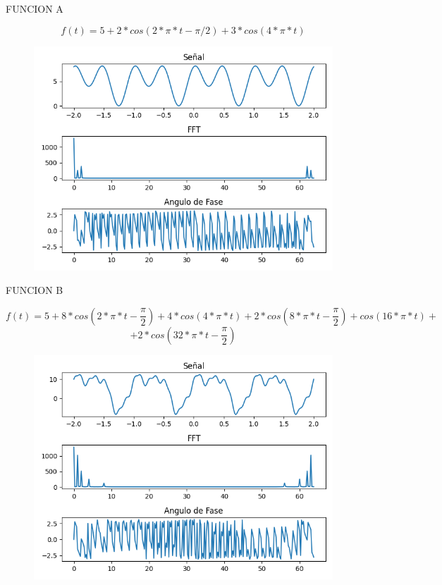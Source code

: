\documentclass[
	12pt, %
]{fphw}
\begin{document}
\newpage

{\color{teal}
  \dotfill
  FUNCION A
\dotfill}

\[f(t)=5+2*cos(2*\pi *t -\pi/2)+3*cos(4*\pi *t)\]

\begin{figure}[H]
  \centering
  \includegraphics[scale=0.8]{images/funcion_a.png}
\end{figure}

\newpage

{\color{teal}
  \dotfill
  FUNCION B
\dotfill}

\[f(t)=5+8*cos(2*\pi *t - \frac{\pi}{2}) + 4*cos(4*\pi *t)+2*cos(8*\pi *t-\frac{\pi}{2})+cos(16*\pi *t)+\]
\[+2*cos(32*\pi *t - \frac{\pi}{2}) \]

\begin{figure}[H]
  \centering
  \includegraphics[scale=0.8]{images/funcion_b.png}
\end{figure}
\end{document}
